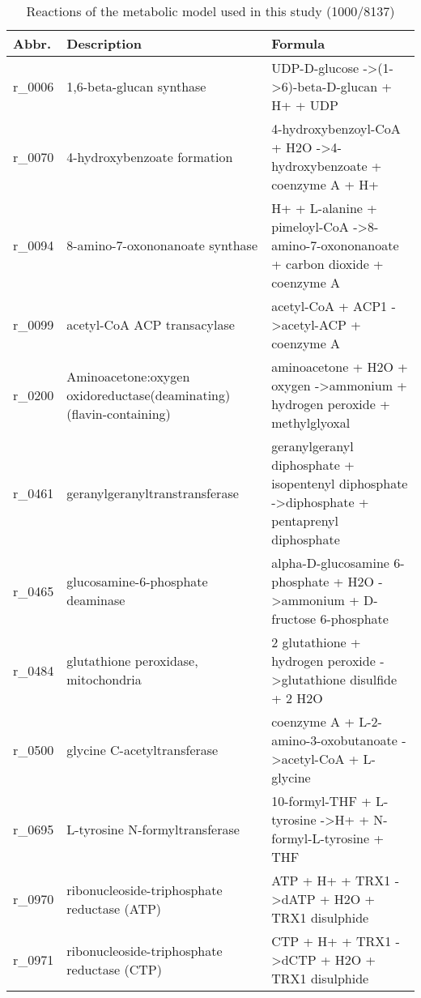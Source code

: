 \begin{landscape}
{\footnotesize
\begin{longtable}{|l|p{7cm}|p{15cm}|}
\caption{Reactions of the metabolic model used in this study (1000/8137)}
\label{tab:my-table}\\
\hline
\textbf{Abbr.} & \textbf{Description} & \textbf{Formula} \\ \hline
\endhead
%
r\_0006 & 1,6-beta-glucan synthase & UDP-D-glucose  -\textgreater (1-\textgreater{}6)-beta-D-glucan + H+ + UDP \\ \hline
r\_0070 & 4-hydroxybenzoate formation & 4-hydroxybenzoyl-CoA + H2O  -\textgreater 4-hydroxybenzoate + coenzyme A + H+ \\ \hline
r\_0094 & 8-amino-7-oxononanoate synthase & H+ + L-alanine + pimeloyl-CoA  -\textgreater 8-amino-7-oxononanoate + carbon dioxide + coenzyme A \\ \hline
r\_0099 & acetyl-CoA ACP transacylase & acetyl-CoA + ACP1  -\textgreater acetyl-ACP + coenzyme A \\ \hline
r\_0200 & Aminoacetone:oxygen oxidoreductase(deaminating)(flavin-containing) & aminoacetone + H2O + oxygen  -\textgreater ammonium + hydrogen peroxide + methylglyoxal \\ \hline
r\_0461 & geranylgeranyltranstransferase & geranylgeranyl diphosphate + isopentenyl diphosphate  -\textgreater diphosphate + pentaprenyl diphosphate \\ \hline
r\_0465 & glucosamine-6-phosphate deaminase & alpha-D-glucosamine 6-phosphate + H2O  -\textgreater ammonium + D-fructose 6-phosphate \\ \hline
r\_0484 & glutathione peroxidase, mitochondria & 2 glutathione + hydrogen peroxide  -\textgreater glutathione disulfide + 2 H2O \\ \hline
r\_0500 & glycine C-acetyltransferase & coenzyme A + L-2-amino-3-oxobutanoate  -\textgreater acetyl-CoA + L-glycine \\ \hline
r\_0695 & L-tyrosine N-formyltransferase & 10-formyl-THF + L-tyrosine  -\textgreater H+ + N-formyl-L-tyrosine + THF \\ \hline
r\_0970 & ribonucleoside-triphosphate reductase (ATP) & ATP + H+ + TRX1  -\textgreater dATP + H2O + TRX1 disulphide \\ \hline
r\_0971 & ribonucleoside-triphosphate reductase (CTP) & CTP + H+ + TRX1  -\textgreater dCTP + H2O + TRX1 disulphide \\ \hline

\end{longtable}}
\end{landscape}
